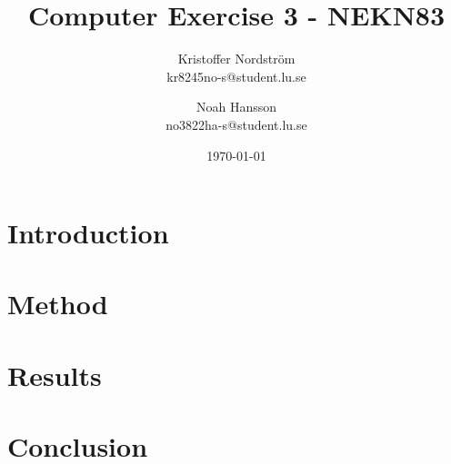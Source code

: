 \documentclass[a4paper]{article}
\title{Computer Exercise 3 - NEKN83}
\author{Kristoffer Nordström \\ kr8245no-s@student.lu.se \and  Noah Hansson \\ no3822ha-s@student.lu.se}
\date{\today}
\begin{document}
\maketitle

\section{Introduction}

\section{Method}

\section{Results}

\section{Conclusion}
\end{document}

